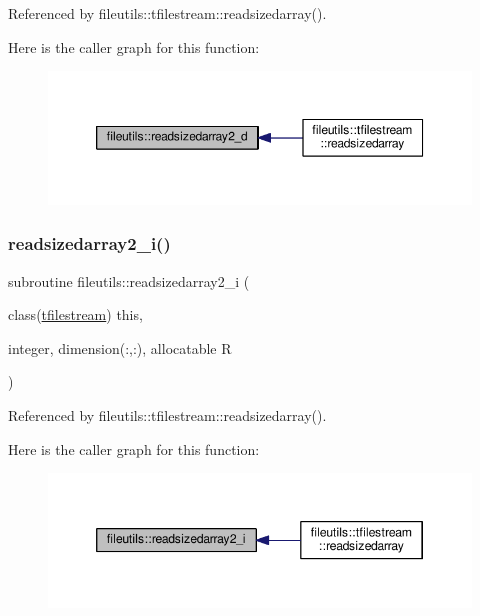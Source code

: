 Referenced by fileutils\+::tfilestream\+::readsizedarray().

Here is the caller graph for this function\+:
\nopagebreak
\begin{figure}[H]
\begin{center}
\leavevmode
\includegraphics[width=350pt]{namespacefileutils_a0057e2b91f8c173074b68aadbe1d3e92_icgraph}
\end{center}
\end{figure}
\mbox{\label{namespacefileutils_acd15bd801738b538b71b3216aaab95cc}} 
\subsubsection{\texorpdfstring{readsizedarray2\+\_\+i()}{readsizedarray2\_i()}}
{\footnotesize\ttfamily subroutine fileutils\+::readsizedarray2\+\_\+i (\begin{DoxyParamCaption}\item[{class(\mbox{\hyperlink{structfileutils_1_1tfilestream}{tfilestream}})}]{this,  }\item[{integer, dimension(\+:,\+:), allocatable}]{R }\end{DoxyParamCaption})\hspace{0.3cm}{\ttfamily [private]}}



Referenced by fileutils\+::tfilestream\+::readsizedarray().

Here is the caller graph for this function\+:
\nopagebreak
\begin{figure}[H]
\begin{center}
\leavevmode
\includegraphics[width=346pt]{namespacefileutils_acd15bd801738b538b71b3216aaab95cc_icgraph}
\end{center}
\end{figure}
\mbox{\label{namespacefileutils_a7fd8e6d80f0ccadb1d773d86d8871816}} 
